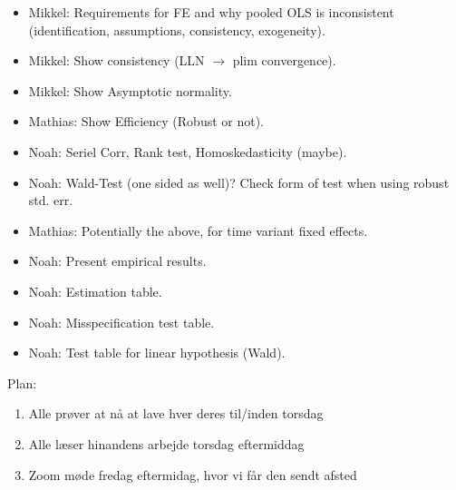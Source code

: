 \begin{itemize}
    \item Mikkel: Requirements for FE and why pooled OLS is inconsistent (identification, assumptions, consistency, exogeneity). 
    \item Mikkel: Show consistency (LLN $\to$ plim convergence). 
    \item Mikkel: Show Asymptotic normality.
    \item Mathias: Show Efficiency (Robust or not).
    \item Noah: Seriel Corr, Rank test, Homoskedasticity (maybe). 
    \item Noah: Wald-Test (one sided as well)? Check form of test when using robust std. err. 
    \item Mathias: Potentially the above, for time variant fixed effects.
    \item Noah: Present empirical results. 
    \item Noah: Estimation table. 
    \item Noah: Misspecification test table.
    \item Noah: Test table for linear hypothesis (Wald). 
\end{itemize}

Plan:
\begin{enumerate}
    \item Alle prøver at nå at lave hver deres til/inden torsdag
    \item Alle læser hinandens arbejde torsdag eftermiddag
    \item Zoom møde fredag eftermidag, hvor vi får den sendt afsted
\end{enumerate}